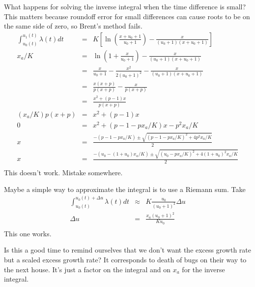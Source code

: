 \documentclass{article}
\begin{document}
What happens for solving the inverse integral when the time difference
is small? This matters because roundoff error for small differences
can cause roots to be on the same side of zero, so Brent's method fails.
\begin{eqnarray}
  \int_{u_0(t)}^{u_1(t)}\lambda(t)dt& =& K\left[
    \ln\left(\frac{x+u_0+1}{u_0+1}\right)-\frac{x}{(u_0+1)(x+u_0+1)}
    \right] \\
  x_a/K & = & \ln\left(1+\frac{x}{u_0+1}\right)-\frac{x}{(u_0+1)(x+u_0+1)} \\
  & = & \frac{x}{u_0+1}-\frac{x^2}{2(u_0+1)^2}-\frac{x}{(u_0+1)(x+u_0+1)} \\
  & = & \frac{x(x+p)}{p(x+p)}-\frac{x}{p(x+p)} \\
  & = & \frac{x^2 +(p-1)x}{p(x+p)} \\
  (x_a/K)p(x+p) & =&  x^2 +(p-1)x \\
  0 & = & x^2 + (p-1-px_a/K)x - p^2x_a/K \\
  x & = & \frac{-(p-1-px_a/K)\pm\sqrt{(p-1-px_a/K)^2+4p^2x_a/K}}{2} \\
  x & = & \frac{-(u_0-(1+u_0)x_a/K)\pm\sqrt{(u_0-px_a/K)^2+4(1+u_0)^2x_a/K}}{2} \\
\end{eqnarray}
This doesn't work. Mistake somewhere.


Maybe a simple way to approximate the integral is
to use a Riemann sum. Take
\begin{eqnarray}
  \int_{u_0(t)}^{u_0(t)+\Delta u}\lambda(t)dt& \approx& K\frac{u_0}{(u_0+1)^2}
      \Delta u \\
  \Delta u&=& \frac{x_a(u_0+1)^2}{Ku_0} \\
\end{eqnarray}
This one works.


Is this a good time to remind ourselves that we don't want the
excess growth rate but a scaled excess growth rate? It corresponds
to death of bugs on their way to the next house. It's just a factor
on the integral and on $x_a$ for the inverse integral.
\end{document}
